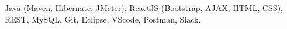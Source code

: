 \documentclass[12pt, a3paper, sans, final]{moderncv}
\newcommand{\ambiente}[1]{
\begin{ident}
    \item[\textbf{\translate{Technical skills}{Compétences techniques}{Competências Técnicas}}]#1
\end{ident}
}
\newcommand{\labelident}[1]{\textsc{#1:}}
\newlength\normalparindent
\newenvironment{ident}{\begin{list}{}
    {\renewcommand{\makelabel}{\labelident}
      \setlength{\itemindent}{0cm}
      \setlength{\leftmargin}{0.8cm}
      \setlength{\labelwidth}{0\normalparindent}
      \addtolength{\topsep}{-1\parskip}
      \setlength{\parsep}{\parskip}}}
  {\end{list}}
\begin{document}
{\begin{adjustwidth}{1cm}{0cm}
\begin{itemize}[leftmargin=1cm, parsep=0.1cm, topsep=-0.25cm]
        \end{itemize}
        \bigskip
        \ambiente{Java (Maven, Hibernate, JMeter), ReactJS (Bootstrap, AJAX, HTML, CSS), REST, MySQL, Git, Eclipse, VScode, Postman, Slack.}
    \end{adjustwidth}
}
\bigskip
\bigskip
\end{document}
